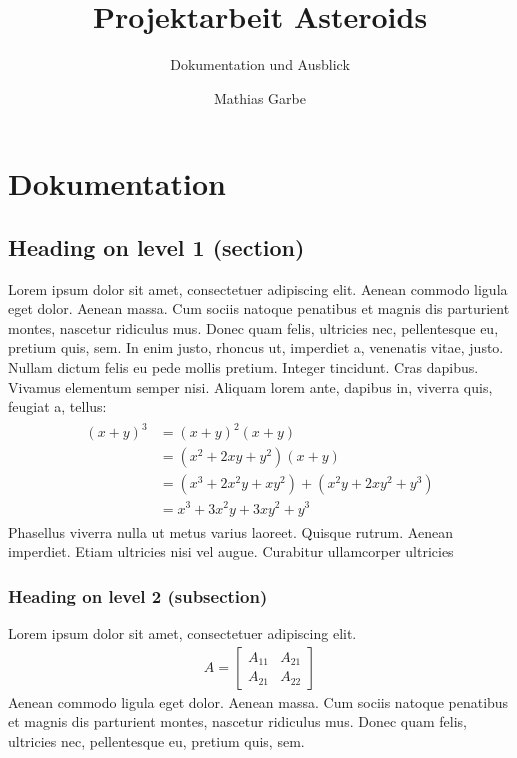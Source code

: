 \documentclass[12pt, a4paper, titlepage, hidelinks]{scrreprt}
\title{Projektarbeit Asteroids}
\subtitle{Dokumentation und Ausblick}
\author{Mathias Garbe}
\begin{document}
\maketitle

\tableofcontents
{}

\clearpage


\chapter{Dokumentation}
\section{Heading on level 1 (section)}
Lorem ipsum dolor sit amet, consectetuer adipiscing elit. Aenean commodo ligula eget dolor. Aenean massa. Cum sociis natoque penatibus et magnis dis parturient montes, nascetur ridiculus mus. Donec quam felis, ultricies nec, pellentesque eu, pretium quis, sem. In enim justo, rhoncus ut, imperdiet a, venenatis vitae, justo. Nullam dictum felis eu pede mollis pretium. Integer tincidunt. Cras dapibus. Vivamus elementum semper nisi. Aliquam lorem ante, dapibus in, viverra quis, feugiat a, tellus:
\begin{align} 
	\begin{split}
	(x+y)^3 	&= (x+y)^2(x+y)\\
					&=(x^2+2xy+y^2)(x+y)\\
					&=(x^3+2x^2y+xy^2) + (x^2y+2xy^2+y^3)\\
					&=x^3+3x^2y+3xy^2+y^3
	\end{split}					
\end{align}
Phasellus viverra nulla ut metus varius laoreet. Quisque rutrum. Aenean imperdiet. Etiam ultricies nisi vel augue. Curabitur ullamcorper ultricies 

\subsection{Heading on level 2 (subsection)}
Lorem ipsum dolor sit amet, consectetuer adipiscing elit. 
\begin{align}
	A = 
	\begin{bmatrix}
	A_{11} & A_{21} \\
  	A_{21} & A_{22}
	\end{bmatrix}
\end{align}
Aenean commodo ligula eget dolor. Aenean massa. Cum sociis natoque penatibus et magnis dis parturient montes, nascetur ridiculus mus. Donec quam felis, ultricies nec, pellentesque eu, pretium quis, sem.
\end{document}
